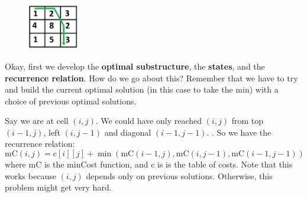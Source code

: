 \begin{figure}
\centering
\includegraphics[width=0.2\textwidth]{Images/figGFGDPSet6MinCostPath2}
\label{figGFGDPSet6MinCostPath2}
\end{figure}

\textbf{}

\RayNotesBegin

Okay, first we develop the \textbf{optimal substructure}, the
\textbf{states}, and the \textbf{recurrence relation}. How do we go about
this? Remember that we have to try and build the current optimal solution
(in this case to take the min) with a choice of previous optimal solutions.

Say we are at cell $(i,j)$. We could have only reached $(i,j)$ from top
$(i-1,j)$, left $(i,j-1)$ and diagonal $(i-1,j-1)$. . So we have the
recurrence relation:
\begin{equation*}
\text{mC}(i,j)
=\text{c}[i][j]+\min(\text{mC}(i-1,j),\text{mC}(i,j-1),\text{mC}(i-1,j-1))
\end{equation*}
where mC is the minCost function, and c is is the table of costs.
Note that this works because $(i,j)$ depends only on previous solutions.
Otherwise, this problem might get very hard. 

